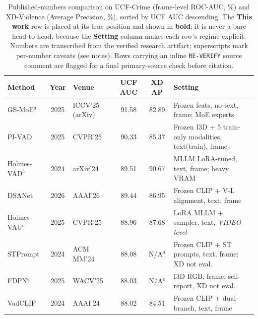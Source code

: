 \begin{table}[t]
\centering
\caption{Published-numbers comparison on UCF-Crime (frame-level ROC-AUC, \%)
and XD-Violence (Average Precision, \%), sorted by UCF AUC descending. The
\textbf{This work} row is placed at its true position and shown in
\textbf{bold}; it is never a bare head-to-head, because the \textbf{Setting}
column makes each row's regime explicit. Numbers are transcribed from the
verified research artifact; superscripts mark per-number caveats (see notes).
Rows carrying an inline \texttt{RE-VERIFY} source comment are flagged for a
final primary-source check before citation.}
\label{tab:sota-full}
\small
\setlength{\tabcolsep}{4pt}
\begin{tabular}{l c l c c l}
\toprule
Method & Year & Venue & UCF AUC & XD AP & Setting \\
\midrule
GS-MoE$^{a}$               & 2025 & ICCV'25 (arXiv)   & 91.58 & 82.89 & Frozen feats, no-text, frame; MoE experts \\ %
PI-VAD                     & 2025 & CVPR'25           & 90.33 & 85.37 & Frozen I3D + 5 train-only modalities, text(train), frame \\
Holmes-VAD$^{b}$           & 2024 & arXiv'24          & 89.51 & 90.67 & MLLM LoRA-tuned, text, frame; heavy VRAM \\ %
DSANet                     & 2026 & AAAI'26           & 89.44 & 86.95 & Frozen CLIP + V-L alignment, text, frame \\
Holmes-VAU$^{c}$           & 2025 & CVPR'25           & 88.96 & 87.68 & LoRA MLLM + sampler, text, \emph{VIDEO-level} \\ %
STPrompt                   & 2024 & ACM MM'24         & 88.08 & N/A$^{d}$ & Frozen CLIP + ST prompts, text, frame; XD not eval. \\
FDPN$^{e}$                 & 2025 & WACV'25           & 88.03 & N/A$^{e}$ & I3D RGB, frame; self-report, XD not eval. \\ %
VadCLIP                    & 2024 & AAAI'24           & 88.02 & 84.51 & Frozen CLIP + dual-branch, text, frame \\

\end{tabular}
\end{table}
